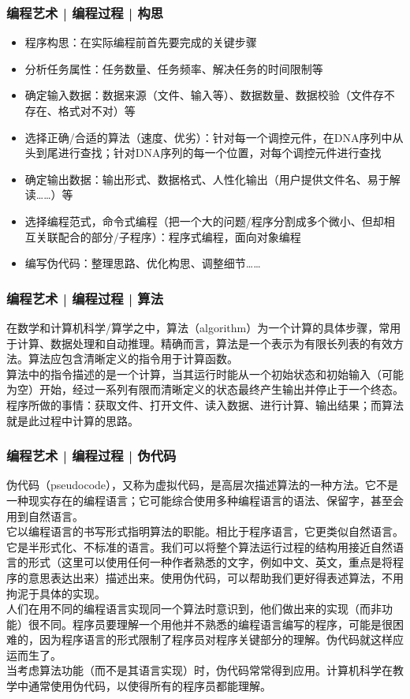 \begin{frame}
  \frametitle{编程艺术 | 编程过程 | \alert{构思}}
  \begin{itemize}
    \item 程序构思：在实际编程前首先要完成的关键步骤
    \item 分析任务属性：任务数量、任务频率、解决任务的时间限制等
    \item 确定输入数据：数据来源（文件、输入等）、数据数量、数据校验（文件存不存在、格式对不对）等
    \item 选择正确/合适的算法（速度、优劣）：针对每一个调控元件，在DNA序列中从头到尾进行查找；针对DNA序列的每一个位置，对每个调控元件进行查找
    \item 确定输出数据：输出形式、数据格式、人性化输出（用户提供文件名、易于解读……）等
    \item 选择编程范式，命令式编程（把一个大的问题/程序分割成多个微小、但却相互关联配合的部分/子程序）：程序式编程，面向对象编程
    \item 编写伪代码：整理思路、优化构思、调整细节……
  \end{itemize}
\end{frame}

\begin{frame}
  \frametitle{编程艺术 | 编程过程 | 算法}
  在数学和计算机科学/算学之中，算法（algorithm）为一个计算的具体步骤，常用于计算、数据处理和自动推理。精确而言，算法是一个表示为有限长列表的有效方法。算法应包含清晰定义的指令用于计算函数。\\
  \vspace{1em}
  算法中的指令描述的是一个计算，当其运行时能从一个初始状态和初始输入（可能为空）开始，经过一系列有限而清晰定义的状态最终产生输出并停止于一个终态。\\
  \vspace{1em}
  程序所做的事情：获取文件、打开文件、读入数据、进行计算、输出结果；而算法就是此过程中计算的思路。
\end{frame}

\begin{frame}
  \frametitle{编程艺术 | 编程过程 | 伪代码}
  伪代码（pseudocode），又称为虚拟代码，是高层次描述算法的一种方法。它不是一种现实存在的编程语言；它可能综合使用多种编程语言的语法、保留字，甚至会用到自然语言。\\
  \vspace{1em}
  它以编程语言的书写形式指明算法的职能。相比于程序语言，它更类似自然语言。它是半形式化、不标准的语言。我们可以将整个算法运行过程的结构用接近自然语言的形式（这里可以使用任何一种作者熟悉的文字，例如中文、英文，重点是将程序的意思表达出来）描述出来。使用伪代码，可以帮助我们更好得表述算法，不用拘泥于具体的实现。\\
  \vspace{1em}
  人们在用不同的编程语言实现同一个算法时意识到，他们做出来的实现（而非功能）很不同。程序员要理解一个用他并不熟悉的编程语言编写的程序，可能是很困难的，因为程序语言的形式限制了程序员对程序关键部分的理解。伪代码就这样应运而生了。\\
  \vspace{1em}
  当考虑算法功能（而不是其语言实现）时，伪代码常常得到应用。计算机科学在教学中通常使用伪代码，以使得所有的程序员都能理解。
\end{frame}

